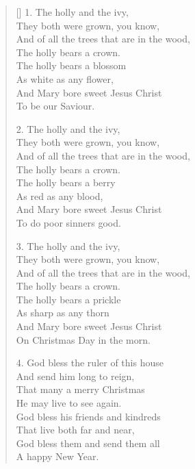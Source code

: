 \begin{multicols}{2}
\begin{verse}[\versewidth]
1. The holly and the ivy,\\
They both were grown, you know,\\
And of all the trees that are in the wood, \\
The holly bears a crown.\\
The holly bears a blossom\\
As white as any flower,\\
And Mary bore sweet Jesus Christ\\
To be our Saviour.

2. The holly and the ivy,\\
They both were grown, you know,\\
And of all the trees that are in the wood, \\
The holly bears a crown.\\
The holly bears a berry\\
As red as any blood,\\
And Mary bore sweet Jesus Christ\\
To do poor sinners good.

3. The holly and the ivy,\\
They both were grown, you know,\\
And of all the trees that are in the wood, \\
The holly bears a crown.\\
The holly bears a prickle\\
As sharp as any thorn\\
And Mary bore sweet Jesus Christ\\
On Christmas Day in the morn.

4. God bless the ruler of this house\\
And send him long to reign,\\
That many a merry Christmas\\
He may live to see again.\\
God bless his friends and kindreds\\
That live both far and near,\\
God bless them and send them all\\
A happy New Year.

\end{verse}
\end{multicols}
